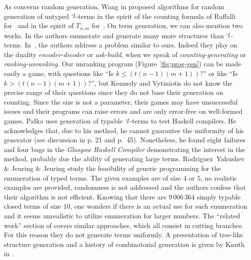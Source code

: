 \documentclass{jfp1}
\begin{document}
  As concerns random generation, Wang in
  \cite{Wang05generatingrandom,wang04:_effic_gener_random_progr_their_applic}
  proposed algorithms for random generation of untyped $`l$-terms in the spirit of the
  counting formula of Raffalli for~\cite{Wang05generatingrandom} and in the spirit of
  $T_{n,m}$ for~\cite{wang04:_effic_gener_random_progr_their_applic}.  On term
  generation, we can also mention two works. In \cite{DBLP:conf/haskell/DuregardJW12}
  the authors enumerate and generate many more structures than
  $`l$-terms. In~\cite{DBLP:journals/jfp/KennedyV12}, the authors address a problem
  similar to ours. Indeed they play on the duality \emph{encoder-decoder} or
  \emph{ask-build}, when we speak of \emph{counting-generating} or
  \emph{ranking-unranking}.  Our unranking program (Figure~\ref{fig:prog-gen}) can be
  made easily a game, with questions like ``Is ${k \le (t (n-1) (m+1))}$?'' or like
  ``Is ${k > (t (n-1) (m+1))}$?'', but Kennedy and Vytiniotis do not know the precise
  range of their questions since they do not base their generation on counting. Since
  the size is not a parameter, their games may have unsuccessful issues and their
  programs can raise errors and are only error-free on well-formed games.  Pa{\l}ka
  \cite{palka12:_testin_compil,Palka:2011:TOC:1982595.1982615} uses generation of
  typable $`l$-terms to test Haskell compilers.  He acknowledges that, due to his
  method, he cannot guarantee the uniformity of his generator (see discussion in
  \cite{palka12:_testin_compil} p. 21 and p.~45).  Nonetheless, he found eight
  failures and four bugs in the \emph{Glasgow Haskell Compiler} demonstrating the
  interest in the method, probably due the ability of generating large terms. \ifJFP
  {Rodriguez~Yakushev} \& Jeuring   \& Jeuring
  \cite{DBLP:conf/aaip/YakushevJ09} \fi study the feasibility of generic
  programming for the enumeration of typed terms. The given examples are of size $4$
  or $5$, no realistic examples are provided, randomness is not addressed and the
  authors confess that their algorithm is not efficient.  Knowing that there are
 $ 9\,006\,364$ simply typable closed terms of size $10$, one wonders if there is an
  actual use for such enumeration and it seems unrealistic to utilize enumeration for
  larger numbers.  The ``related work'' section of \cite{DBLP:conf/aaip/YakushevJ09}
  covers similar approaches, which all consist in cutting branches.  For this reason
  they do not generate terms uniformly.  A presentation of tree-like structure
  generation and a history of combinatorial generation is given \ifJFP by Knuth
  \else in \cite{KnuthTAOCP_4_4}\fi.
\end{document}
